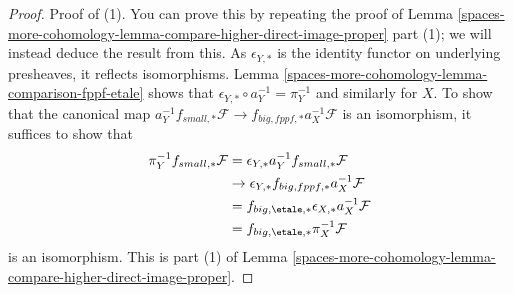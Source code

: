 \begin{proof}
Proof of (1). You can prove this by repeating the proof of
Lemma \ref{spaces-more-cohomology-lemma-compare-higher-direct-image-proper} part (1);
we will instead deduce the result from this.
As $\epsilon_{Y, *}$ is the identity functor on underlying presheaves,
it reflects isomorphisms. Lemma \ref{spaces-more-cohomology-lemma-comparison-fppf-etale}
shows that $\epsilon_{Y, *} \circ a_Y^{-1} = \pi_Y^{-1}$
and similarly for $X$. To show that the canonical map
$a_Y^{-1}f_{small, *}\mathcal{F} \to f_{big, fppf, *}a_X^{-1}\mathcal{F}$
is an isomorphism, it suffices to show that
\begin{align*}
\pi_Y^{-1}f_{small, *}\mathcal{F}
& =
\epsilon_{Y, *}a_Y^{-1}f_{small, *}\mathcal{F} \\
& \to
\epsilon_{Y, *}f_{big, fppf, *}a_X^{-1}\mathcal{F} \\
& =
f_{big, \etale, *} \epsilon_{X, *}a_X^{-1}\mathcal{F} \\
& =
f_{big, \etale, *}\pi_X^{-1}\mathcal{F}
\end{align*}
is an isomorphism. This is part
(1) of Lemma \ref{spaces-more-cohomology-lemma-compare-higher-direct-image-proper}.


\end{proof}

